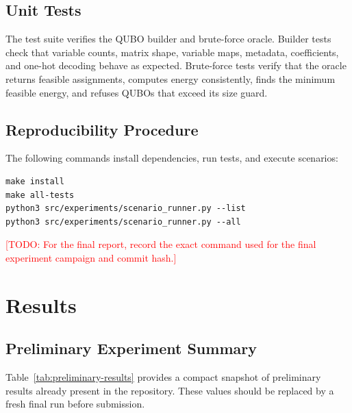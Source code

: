 \documentclass[12pt,a4paper,oneside]{report}
\newcommand{\todo}[1]{\textcolor{red}{[TODO: #1]}}
\begin{document}
\section{Unit Tests}

The test suite verifies the QUBO builder and brute-force oracle. Builder tests
check that variable counts, matrix shape, variable maps, metadata, coefficients,
and one-hot decoding behave as expected. Brute-force tests verify that the
oracle returns feasible assignments, computes energy consistently, finds the
minimum feasible energy, and refuses QUBOs that exceed its size guard.

\section{Reproducibility Procedure}

The following commands install dependencies, run tests, and execute scenarios:

\begin{lstlisting}[caption={Reproducibility commands.}]
make install
make all-tests
python3 src/experiments/scenario_runner.py --list
python3 src/experiments/scenario_runner.py --all
\end{lstlisting}

\todo{For the final report, record the exact command used for the final
experiment campaign and commit hash.}

\chapter{Results}
\label{chap:results}

\section{Preliminary Experiment Summary}

Table~\ref{tab:preliminary-results} provides a compact snapshot of preliminary
results already present in the repository. These values should be replaced by a
fresh final run before submission.
\end{document}
